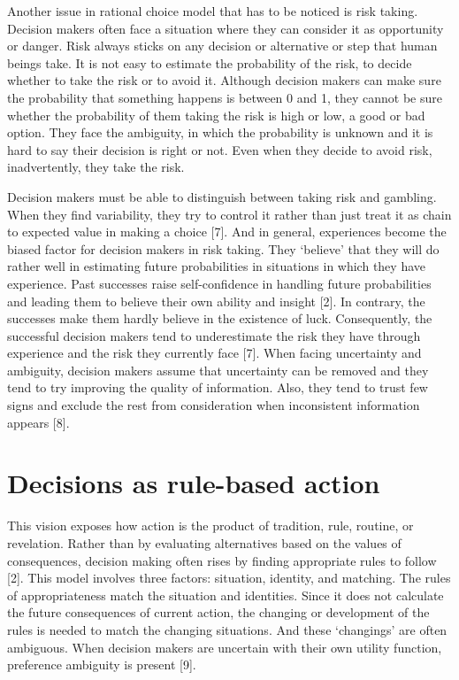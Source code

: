 Another issue in rational choice model that has to be noticed is risk taking. Decision makers often face a situation where they can consider it as opportunity or danger. Risk always sticks on any decision or alternative or step that human beings take. It is not easy to estimate the probability of the risk, to decide whether to take the risk or to avoid it. Although decision makers can make sure the probability that something happens is between 0 and 1, they cannot be sure whether the probability of them taking the risk is high or low, a good or bad option. They face the ambiguity, in which the probability is unknown and it is hard to say their decision is right or not. Even when they decide to avoid risk, inadvertently, they take the risk.

Decision makers must be able to distinguish between taking risk and gambling. When they find variability, they try to control it rather than just treat it as chain to expected value in making a choice [7]. And in general, experiences become the biased factor for decision makers in risk taking. They ‘believe’ that they will do rather well in estimating future probabilities in situations in which they have experience. Past successes raise self-confidence in handling future probabilities and leading them to believe their own ability and insight [2]. In contrary, the successes make them hardly believe in the existence of luck. Consequently, the successful decision makers tend to underestimate the risk they have through experience and the risk they currently face [7]. When facing uncertainty and ambiguity, decision makers assume that uncertainty can be removed and they tend to try improving the quality of information. Also, they tend to trust few signs and exclude the rest from consideration when inconsistent information appears [8].

\section{Decisions as rule-based action}

This vision exposes how action is the product of tradition, rule, routine, or revelation. Rather than by evaluating alternatives based on the values of consequences, decision making often rises by finding appropriate rules to follow [2]. This model involves three factors: situation, identity, and matching. The rules of appropriateness match the situation and identities. Since it does not calculate the future consequences of current action, the changing or development of the rules is needed to match the changing situations. And these ‘changings’ are often ambiguous. When decision makers are uncertain with their own utility function, preference ambiguity is present [9].

